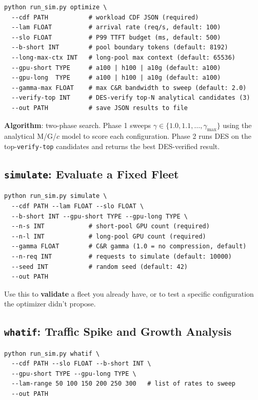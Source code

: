 \documentclass[11pt,a4paper]{article}
\begin{document}
\begin{lstlisting}[style=shell]
python run_sim.py optimize \
  --cdf PATH           # workload CDF JSON (required)
  --lam FLOAT          # arrival rate (req/s, default: 100)
  --slo FLOAT          # P99 TTFT budget (ms, default: 500)
  --b-short INT        # pool boundary tokens (default: 8192)
  --long-max-ctx INT   # long-pool max context (default: 65536)
  --gpu-short TYPE     # a100 | h100 | a10g (default: a100)
  --gpu-long  TYPE     # a100 | h100 | a10g (default: a100)
  --gamma-max FLOAT    # max C&R bandwidth to sweep (default: 2.0)
  --verify-top INT     # DES-verify top-N analytical candidates (3)
  --out PATH           # save JSON results to file
\end{lstlisting}

\textbf{Algorithm}: two-phase search.
Phase 1 sweeps $\gamma \in \{1.0, 1.1, \ldots, \gamma_{\max}\}$ using
the analytical M/G/$c$ model to score each configuration.
Phase 2 runs DES on the top-\texttt{verify-top} candidates and
returns the best DES-verified result.

\subsection{\texttt{simulate}: Evaluate a Fixed Fleet}

\begin{lstlisting}[style=shell]
python run_sim.py simulate \
  --cdf PATH --lam FLOAT --slo FLOAT \
  --b-short INT --gpu-short TYPE --gpu-long TYPE \
  --n-s INT            # short-pool GPU count (required)
  --n-l INT            # long-pool GPU count (required)
  --gamma FLOAT        # C&R gamma (1.0 = no compression, default)
  --n-req INT          # requests to simulate (default: 10000)
  --seed INT           # random seed (default: 42)
  --out PATH
\end{lstlisting}

Use this to \textbf{validate} a fleet you already have, or to test a
specific configuration the optimizer didn't propose.

\subsection{\texttt{whatif}: Traffic Spike and Growth Analysis}

\begin{lstlisting}[style=shell]
python run_sim.py whatif \
  --cdf PATH --slo FLOAT --b-short INT \
  --gpu-short TYPE --gpu-long TYPE \
  --lam-range 50 100 150 200 250 300   # list of rates to sweep
  --out PATH
\end{lstlisting}
\end{document}
